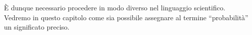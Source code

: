 %
%
%
È dunque necessario procedere in modo diverso nel linguaggio scientifico.
Vedremo in questo capitolo come sia possibile assegnare al termine \enquote{probabilità} un significato preciso.



